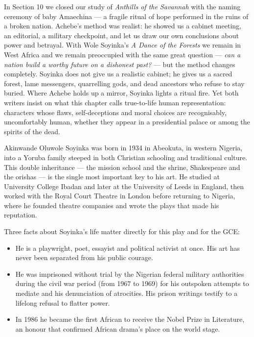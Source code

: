 \documentclass[11pt]{article}
\newcommand{\cle}[1]{{\popxbold\color{popdark}#1}}
\newcounter{popsec}
\newcounter{popsub}
\newcommand{\courssub}[1]{%
  \stepcounter{popsub}%
  \par\vspace{9pt}\noindent{\popxbold\fontsize{11.5}{13}\selectfont\color{popink}{\color{poporange}\thepopsec.\thepopsub}\hspace{6pt}#1}\par\nopagebreak\vspace{4pt}
}
\begin{document}
In Section 10 we closed our study of \emph{Anthills of the Savannah} with the naming ceremony of baby Amaechina — a fragile ritual of hope performed in the ruins of a broken nation. Achebe's method was realist: he showed us a cabinet meeting, an editorial, a military checkpoint, and let us draw our own conclusions about power and betrayal. With Wole Soyinka's \emph{A Dance of the Forests} we remain in West Africa and we remain preoccupied with the same great question — \emph{can a nation build a worthy future on a dishonest past?} — but the method changes completely. Soyinka does not give us a realistic cabinet; he gives us a sacred forest, lame messengers, quarrelling gods, and dead ancestors who refuse to stay buried. Where Achebe holds up a mirror, Soyinka lights a ritual fire. Yet both writers insist on what this chapter calls \cle{true-to-life human representation}: characters whose flaws, self-deceptions and moral choices are recognisably, uncomfortably human, whether they appear in a presidential palace or among the spirits of the dead.

\courssub{Wole Soyinka: A Relevant Biography}

Akinwande Oluwole Soyinka was born in 1934 in Abeokuta, in western Nigeria, into a Yoruba family steeped in both Christian schooling and traditional culture. This double inheritance — the mission school and the shrine, Shakespeare and the orishas — is the single most important key to his art. He studied at University College Ibadan and later at the University of Leeds in England, then worked with the Royal Court Theatre in London before returning to Nigeria, where he founded theatre companies and wrote the plays that made his reputation.

Three facts about Soyinka's life matter directly for this play and for the GCE:

\begin{itemize}
\item He is a \cle{playwright, poet, essayist and political activist} at once. His art has never been separated from his public courage.
\item He was \cle{imprisoned without trial} by the Nigerian federal military authorities during the civil war period (from 1967 to 1969) for his outspoken attempts to mediate and his denunciation of atrocities. His prison writings testify to a lifelong refusal to flatter power.
\item In \cle{1986} he became the first African to receive the \cle{Nobel Prize in Literature}, an honour that confirmed African drama's place on the world stage.
\end{itemize}
\end{document}
